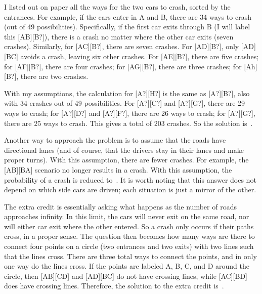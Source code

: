 \documentclass{article}
\begin{document}
I listed out on paper all the ways for the two cars to crash, sorted by the entrances.
For example, if the cars enter in A and B, there are 34 ways to crash (out of 49 possibilities).
Specifically, if the first car exits through B (I will label this [AB][B?]), there is a crash no matter where the other car exits (seven crashes).
Similarly, for [AC][B?], there are seven crashes.
For [AD][B?], only [AD][BC] avoids a crash, leaving six other crashes.
For [AE][B?], there are five crashes; for [AF][B?], there are four crashes; for [AG][B?], there are three crashes; for [Ah][B?], there are two crashes.

With my assumptions, the calculation for [A?][H?] is the same as [A?][B?], also with 34 crashes out of 49 possibilities.
For [A?][C?] and [A?][G?], there are 29 ways to crash; for [A?][D?] and [A?][F?], there are 26 ways to crash; for [A?][G?], there are 25 ways to crash.
This gives a total of 203 crashes.
So the solution is
\,.

Another way to approach the problem is to assume that the roads have directional lanes (and of course, that the drivers stay in their lanes and make proper turns).
With this assumption, there are fewer crashes.
For example, the [AB][BA] scenario no longer results in a crash.
With this assumption, the probability of a crash is reduced to
\,.
It is worth noting that this answer does not depend on which side cars are driven; each situation is just a mirror of the other.

The extra credit is essentially asking what happens as the number of roads approaches infinity.
In this limit, the cars will never exit on the same road, nor will either car exit where the other entered.
So a crash only occurs if their paths cross, in a proper sense.
The question then becomes how many ways are there to connect four points on a circle (two entrances and two exits) with two lines such that the lines cross.
There are three total ways to connect the points, and in only one way do the lines cross.
If the points are labeled A, B, C, and D around the circle, then [AB][CD] and [AD][BC] do not have crossing lines, while [AC][BD] does have crossing lines.
Therefore, the solution to the extra credit is
\,.
\end{document}
